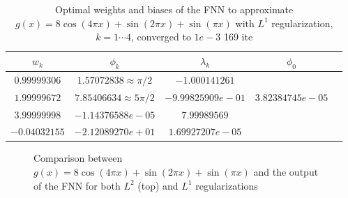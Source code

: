 \documentclass[AMS,STIX1COL]{WileyNJD-v2}
\begin{document}
 \begin{table}[!h]
  \begin{center}
  \begin{tabular}{ |c|c|c|c|c| } 
\hline
$w_k$ & $\phi_k$ & $\lambda_k$& $\phi_0$ \\
\hline
$0.99999306$ & $1.57072838 \approx \pi/2$ &$-1.000141261$& \\ 
$1.99999672$&$7.85406634 \approx 5\pi/2$ & $-9.99825909e-01$& $3.82384745e-05$ \\ 
$3.99999998$& $-1.14376588e-05$ & $7.99989569$& \\ 
$ -0.04032155$& $-2.12089270e+01$ & $1.69927207e-05$& \\ 
\hline
\end{tabular}
\caption{Optimal weights and biases of the FNN to approximate $ g(x) = 8 \cos(4\pi x) + \sin(2\pi x) + \sin(\pi x)$ with $L^1$ regularization, $k = 1\cdots4$, converged to $1e-3$ 169 ite}\label{tabpercompL1}
\end{center}
\end{table}
 \begin{figure}[!htb]
    \centering
    \caption{Comparison between $g(x) = 8 \cos(4\pi x) + \sin(2\pi x) + \sin(\pi x)$ and the output of the FNN for both $L^2$ (top) and $L^1$ regularizations}
    \label{fig:fourvsNN_outside}
\end{figure}
\end{document}
